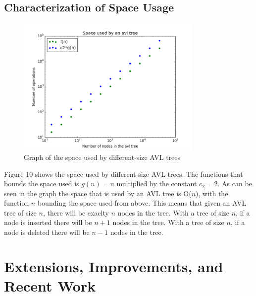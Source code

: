\documentclass[12pt]{article}
\begin{document}
\subsection*{Characterization of Space Usage}
\begin{figure}[h]
\caption{Graph of the space used by different-size AVL trees}
\includegraphics[width=9cm]{space_used.png}
\centering
\end{figure}
\noindent
Figure 10 shows the space used by different-size AVL trees.  The functions
that bounds the space used is $g(n) = n$ multiplied by the constant $c_2 = 2$. 
As can be seen in the graph the space that is used by an AVL tree is O($n$),
with the function $n$ bounding the space used from above.  This means that given
an AVL tree of size $n$, there will be exaclty $n$ nodes in the tree.  With a
tree of size $n$, if a node is inserted there will be $n+1$ nodes in the tree. 
With a tree of size $n$, if a node is deleted there will be $n-1$ nodes in the
tree.

\section*{Extensions, Improvements, and Recent Work}

\newpage
{}



\end{document}

